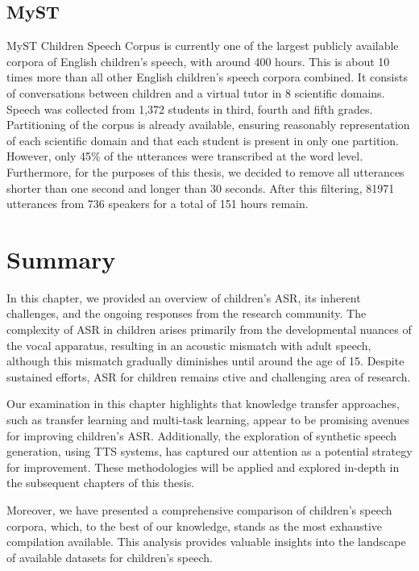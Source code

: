 \subsection{MyST}
\ac{MyST} Children Speech Corpus \cite{MyST} is currently one of the largest publicly available corpora of English children's speech, with around 400 hours. This is about 10 times more than all other English children's speech corpora combined. It consists of conversations between children and a virtual tutor in 8 scientific domains. Speech was collected from 1,372  students in third, fourth and fifth grades. Partitioning of the corpus is already available, ensuring reasonably representation of each scientific domain and that each student is present in only one partition. However, only 45\% of the utterances were transcribed at the word level. Furthermore, for the purposes of this thesis, we decided to remove all utterances shorter than one second and longer than 30 seconds. After this filtering, 81971 utterances from 736 speakers for a total of 151 hours remain.


\section{Summary}
In this chapter, we provided an overview of children's \ac{ASR}, its inherent challenges, and the ongoing responses from the research community. The complexity of \ac{ASR} in children arises primarily from the developmental nuances of the vocal apparatus, resulting in an acoustic mismatch with adult speech, although this mismatch gradually diminishes until around the age of 15. Despite sustained efforts, \ac{ASR} for children remains ctive and challenging area of research.

Our examination in this chapter highlights that knowledge transfer approaches, such as transfer learning and multi-task learning, appear to be promising avenues for improving children's \ac{ASR}. Additionally, the exploration of synthetic speech generation, using \ac{TTS} systems, has captured our attention as a potential strategy for improvement. These methodologies will be applied and explored in-depth in the subsequent chapters of this thesis.

Moreover, we have presented a comprehensive comparison of children's speech corpora, which, to the best of our knowledge, stands as the most exhaustive compilation available. This analysis provides valuable insights into the landscape of available datasets for children's speech.
